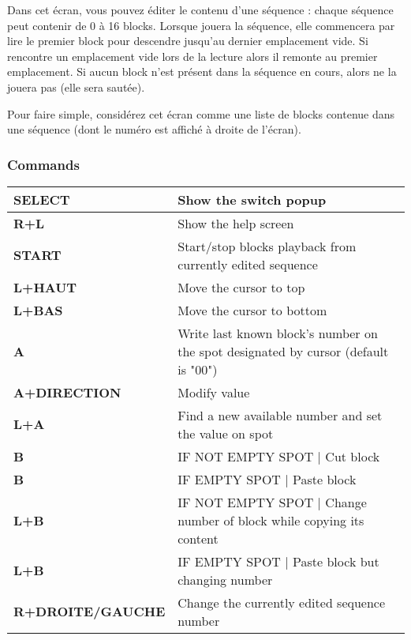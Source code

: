 Dans cet écran, vous pouvez éditer le contenu d'une séquence : chaque séquence peut contenir de 0 à 16 blocks.
Lorsque \FAT jouera la séquence, elle commencera par lire le premier block pour descendre jusqu'au dernier emplacement vide.
Si \FAT rencontre un emplacement vide lors de la lecture alors il remonte au premier emplacement.
Si aucun block n'est présent dans la séquence en cours, alors \FAT ne la jouera pas (elle sera sautée).
\medskip

Pour faire simple, considérez cet écran comme une liste de blocks contenue dans une séquence (dont le numéro est affiché à droite de l'écran).


\subsubsection{Commands}
\tablelasttail{\hline}
\begin{supertabular}{|l|p{11cm}|}
\hline
    {\bf SELECT} & Show the switch popup \\
    \hline
    {\bf R+L} & Show the help screen \\
    \hline
    {\bf START} & Start/stop blocks playback from currently edited sequence \\
    \hline
    {\bf L+HAUT} & Move the cursor to top \\
    \hline
    {\bf L+BAS} & Move the cursor to bottom \\
    \hline
    {\bf A} & Write last known block's number on the spot designated by cursor (default is "00") \\
    \hline
    {\bf A+DIRECTION} & Modify value \\
    \hline
    {\bf L+A} & Find a new available number and set the value on spot \\
    \hline
    {\bf B} & IF NOT EMPTY SPOT | Cut block \\
    \hline
    {\bf B} & IF EMPTY SPOT | Paste block \\
    \hline
    {\bf L+B} & IF NOT EMPTY SPOT | Change number of block while copying its content \\
    \hline
    {\bf L+B} & IF EMPTY SPOT | Paste block but changing number \\
    \hline
    {\bf R+DROITE/GAUCHE} & Change the currently edited sequence number \\
\hline
\end{supertabular}
